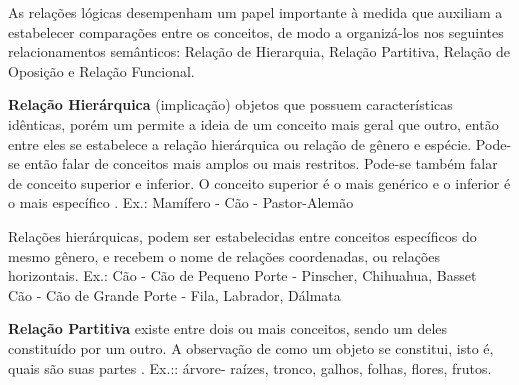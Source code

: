 \begin{table}
\centering
{}
\caption{Relacionamentos Lógicos. Fonte: \cite{dahlberg:1978.teoria}}
\label{tab:dahlberg_logica}
\end{table}

As relações lógicas desempenham um papel importante à medida que auxiliam a estabelecer comparações entre os conceitos, de modo a organizá-los nos seguintes relacionamentos semânticos: Relação de Hierarquia, Relação Partitiva, Relação de Oposição e Relação Funcional.

\textbf{Relação Hierárquica} (implicação) objetos que possuem características idênticas, porém um permite a ideia de um conceito mais geral que outro, então entre eles se estabelece a relação hierárquica ou relação de gênero e espécie. Pode-se então falar de conceitos mais amplos ou mais restritos. Pode-se também falar de conceito superior e inferior. O conceito superior é o mais genérico e o inferior é o mais específico \citep{dahlberg:1978.fundamentos}.
Ex.: Mamífero - Cão - Pastor-Alemão

Relações hierárquicas, podem ser estabelecidas entre conceitos específicos do mesmo gênero, e recebem o nome de relações coordenadas, ou relações horizontais.
Ex.: Cão - Cão de Pequeno Porte - Pinscher, Chihuahua, Basset \\
     Cão - Cão de Grande Porte - Fila, Labrador, Dálmata

\textbf{Relação Partitiva} existe entre dois ou mais conceitos, sendo um deles constituído por um outro. A observação de como um objeto se constitui, isto é, quais são suas partes \citep{campos:2001.organizacao}.
Ex.:: árvore- raízes, tronco, galhos, folhas, flores, frutos.

